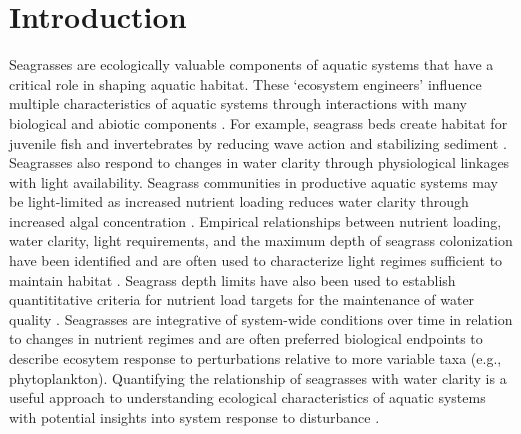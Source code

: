 \documentclass[letterpaper,12pt,oneside]{article}\usepackage[]{graphicx}\usepackage[]{color}
\begin{document}
\clearpage

\acresetall

\section{Introduction}

Seagrasses are ecologically valuable components of aquatic systems that have a critical role in shaping aquatic habitat.  These `ecosystem engineers' influence multiple characteristics of aquatic systems through interactions with many biological and abiotic components \citep{Jones94,Koch01}.  For example, seagrass beds create habitat for juvenile fish and invertebrates by reducing wave action and stabilizing sediment \citep{williams01,Hughes09}.  Seagrasses also respond to changes in water clarity through physiological linkages with light availability.  Seagrass communities in productive aquatic systems may be light-limited as increased nutrient loading reduces water clarity through increased algal concentration \citep{Duarte95}.  Empirical relationships between nutrient loading, water clarity, light requirements, and the maximum depth of seagrass colonization have been identified \citep{Duarte91,Kenworthy96,Choice14} and are often used to characterize light regimes sufficient to maintain habitat \citep{Steward05}.  Seagrass depth limits have also been used to establish quantititative criteria for nutrient load targets for the maintenance of water quality \citep{Janicki96}.  Seagrasses are integrative of system-wide conditions over time in relation to changes in nutrient regimes \citep{Duarte95} and are often preferred biological endpoints to describe ecosytem response to perturbations relative to more variable taxa (e.g., phytoplankton).  Quantifying the relationship of seagrasses with water clarity is a useful approach to understanding ecological characteristics of aquatic systems with potential insights into system response to disturbance \citep{Greve05}.    
\end{document}
